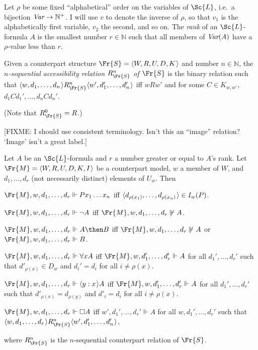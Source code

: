 \documentclass[11pt]{woarticle}
\theoremstyle{break}
\theoremstyle{nonumberplain}
\newcommand{\SAT}{\Vdash}
\newcommand{\1}{\;\,|\;\,}
\newcommand{\var}{\emph{Var}}
\renewcommand{\t}[1]{\ensuremath{\langle #1  \makebox[.2ex]{}\rangle}}
\begin{document}
\begin{definition}[Rank]{\label{!RANK}}
  Let $\rho$ be some fixed ``alphabetical'' order on the variables of $\Sc{L}$,
  i.e.\ a bijection $\emph{Var} \to \mathbb{N}^+$. I will use $v$ to denote the
  inverse of $\rho$, so that $v_1$ is the alphabetically first variable, $v_2$
  the second, and so on. The \emph{rank} of an $\Sc{L}$-formula $A$ is the
  smallest number $r \in \mathbb{N}$ such that all members of $\var(A)$ have a
  $\rho$-value less than $r$.
\end{definition}

\begin{definition}{\label{!SEQCR}}
  Given a counterpart structure $\Fr{S} = \t{W,R,U,D,K}$ and number
  $n \in \mathbb{N}$, the \emph{$n$-sequential accessibility relation
    $R^n_{\Fr{S}}$ of $\Fr{S}$} is the binary relation such that
  $\t{w,d_1,\ldots,d_n} R^n_{\Fr{S}} \t{w',d_1',\ldots,d_n'}$ iff $wRw'$ and for
  some $C \in K_{w,w'}$, $d_1Cd_1',\ldots,d_nCd_n'$.
\end{definition}
%
(Note that $R^0_{\Fr{S}} = R$.)

[FIXME: I should use consistent terminology. Isn't this an ``image'' relation? `Image'
isn't a great label.]

\begin{definition}{\label{!SATSEQ}}
  Let $A$ be an $\Sc{L}$-formula and $r$ a number greater or equal to $A$'s
  rank. Let $\Fr{M} = \t{W,R,U,D,K,I}$ be a counterpart model, $w$ a member of
  $W$, and $d_1,\ldots,d_r$ (not necessarily distinct) elements of $U_w$. Then
  \begin{semantics}
  \item[$\Fr{M},w,d_1,\ldots,d_r \SAT Px_1\ldots x_n$] iff
    $\t{d_{\rho(x_1)},\ldots,d_{\rho(x_n)}} \in I_w(P)$.
  \item[$\Fr{M},w,d_1,\ldots,d_r \SAT \neg A$] iff
    $\Fr{M},w,d_1,\ldots,d_r \not\SAT A$.
  \item[$\Fr{M},w,d_1,\ldots,d_r \SAT A \then B$] iff
    $\Fr{M},w,d_1,\ldots,d_r \not\SAT A$ or
    $\Fr{M},w,d_1,\ldots,d_r \SAT B$.
  \item[$\Fr{M},w,d_1,\ldots,d_r \SAT \forall x A$] iff
    $\Fr{M},w,d_1',\ldots,d_r' \SAT A$ for all $d_1',\ldots,d_r'$
    such that $d'_{\rho(x)} \in D_w$ and $d_i'=d_i$ for all $i
    \not= \rho(x)$.
  \item[$\Fr{M},w,d_1,\ldots,d_r \SAT \t{y:x} A$] iff
    $\Fr{M},w,d_1',\ldots,d_r' \SAT A$ for all $d_1',\ldots,d_r'$
    such that $d'_{\rho(x)} = d_{\rho(y)}$ and $d'_i = d_i$ for all
    $i\not=\rho(x)$.
  \item[$\Fr{M},w,d_1,\ldots,d_r \SAT \Box A$] iff
    $w',d_1',\ldots,d_r' \SAT A$ for all $w,d_1',\ldots,d_r'$
    such that $\t{w,d_1,\ldots,d_r} R^n_{\Fr{S}} \t{w',d_1',\ldots,d_n'}$,
  \end{semantics}
  where $R^n_{\Fr{S}}$ is the $n$-sequential counterpart relation of $\Fr{S}$.
\end{definition}
\end{document}
